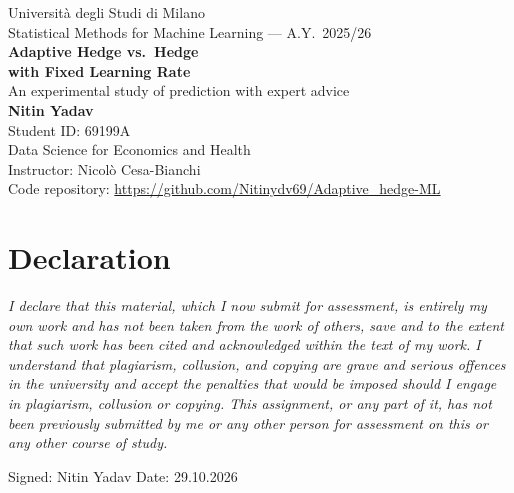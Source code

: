 \documentclass[11pt,a4paper]{article}
\begin{document}
\begin{titlepage}
\thispagestyle{empty}
\centering
\vspace*{2.5cm}
{\large Universit\`a degli Studi di Milano}\\[0.3cm]
{\large Statistical Methods for Machine Learning --- A.Y.\ 2025/26}\\[0.2cm]
{\Huge\bfseries Adaptive Hedge vs.\ Hedge\\[0.3cm] with Fixed Learning Rate}\\[0.6cm]
{\Large An experimental study of prediction with expert advice}\\[3cm]
{\Large\textbf{Nitin Yadav}}\\[0.3cm]
{\large Student ID: 69199A}\\[0.3cm]
{\large Data Science for Economics and Health}\\[2.2cm]
Instructor: Nicol\`o Cesa-Bianchi\\[0.5cm]
Code repository: \url{https://github.com/Nitinydv69/Adaptive_hedge-ML}\\[0.2cm]
\section*{\centering Declaration}
\emph{I declare that this material, which I now submit for assessment, is entirely my own work and has not been
taken from the work of others, save and to the extent that such work has been cited and acknowledged within the
text of my work. I understand that plagiarism, collusion, and copying are grave and serious offences in the
university and accept the penalties that would be imposed should I engage in plagiarism, collusion or copying.
This assignment, or any part of it, has not been previously submitted by me or any other person for assessment
on this or any other course of study.}

\vspace{0.3cm}

\noindent Signed: Nitin Yadav \hfill Date: 29.10.2026
\end{titlepage}


\setcounter{page}{2}
\clearpage
\end{document}
